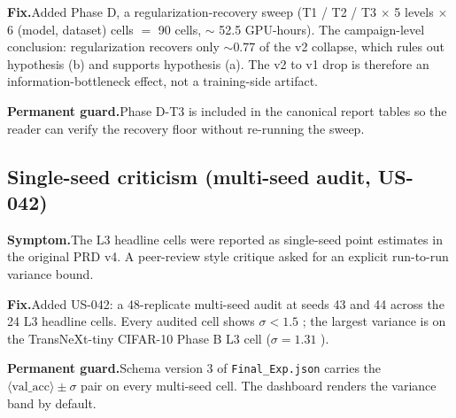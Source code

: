 \textbf{Fix.}\quad Added Phase D, a regularization-recovery sweep
(T1 / T2 / T3 $\times$ 5 levels $\times$ 6 (model, dataset) cells $=$
90 cells, $\sim$ 52.5 GPU-hours). The campaign-level conclusion:
regularization recovers only $\sim 0.77$ \Mpp{} of the v2 collapse,
which rules out hypothesis (b) and supports hypothesis (a). The v2
to v1 drop is therefore an information-bottleneck effect, not a
training-side artifact.

\textbf{Permanent guard.}\quad Phase D-T3 is included in the canonical
report tables so the reader can verify the recovery floor without
re-running the sweep.

\subsection{Single-seed criticism (multi-seed audit, US-042)}
\textbf{Symptom.}\quad The L3 headline cells were reported as single-seed
point estimates in the original PRD v4. A peer-review style critique
asked for an explicit run-to-run variance bound.

\textbf{Fix.}\quad Added US-042: a 48-replicate multi-seed audit at
seeds 43 and 44 across the 24 L3 headline cells. Every audited cell
shows $\sigma < 1.5$ \Mpp{}; the largest variance is on the
TransNeXt-tiny CIFAR-10 Phase B L3 cell ($\sigma = 1.31$ \Mpp{}).

\textbf{Permanent guard.}\quad Schema version 3 of
\texttt{Final\_Exp.json} carries the
$\langle\mathrm{val\_acc}\rangle \pm \sigma$ pair on every multi-seed
cell. The dashboard renders the variance band by default.
